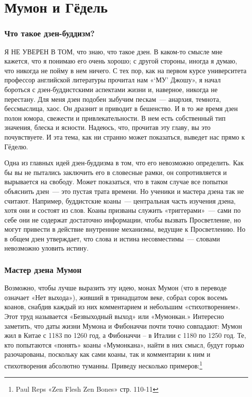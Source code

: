 \documentclass[../main.tex]{subfiles}
\begin{document}
\chapter{Мумон и Гёдель}

\subsection{Что такое дзен-буддизм?}

Я НЕ УВЕРЕН В ТОМ, что знаю, что такое дзен. В каком-то смысле мне кажется, что я понимаю его очень хорошо; с другой стороны, иногда я думаю, что никогда не пойму в нем ничего. С тех пор, как на первом курсе университета профессор английской литературы прочитал нам «\enquote*{МУ} Джошу», я начал бороться с дзен-буддистскими аспектами жизни и, наверное, никогда не перестану. Для меня дзен подобен зыбучим пескам~--- анархия, темнота, бессмыслица, хаос. Он дразнит и приводит в бешенство. И в то же время дзен полон юмора, свежести и привлекательности. В нем есть собственный тип значения, блеска и ясности. Надеюсь, что, прочитав эту главу, вы это почувствуете. И эта тема, как ни странно может показаться, выведет нас прямо к Гёделю.

Одна из главных идей дзен-буддизма в том, что его невозможно определить. Как бы вы не пытались заключить его в словесные рамки, он сопротивляется и вырывается на свободу. Может показаться, что в таком случае все попытки объяснить дзен~--- это пустая трата времени. Но ученики и мастера дзена так не считают. Например, буддистские коаны~--- центральная часть изучения дзена, хотя они и состоят из слов. Коаны призваны служить «триггерами»~--- сами по себе они не содержат достаточно информации, чтобы вызвать Просветление, но могут привести в действие внутренние механизмы, ведущие к Просветлению. Но в общем дзен утверждает, что слова и истина несовместимы~--- словами невозможно уловить истину.


\subsection{Мастер дзена Мумон}

Возможно, чтобы лучше выразить эту идею, монах Мумон (что в переводе означает «Нет выхода»), живший в тринадцатом веке, собрал сорок восемь коанов, снабдив каждый из них комментарием и небольшим «стихотворением». Этот труд называется «Безвыходный выход» или «Мумонкан.» Интересно заметить, что даты жизни Мумона и Фибоначчи почти точно совпадают: Мумон жил в Китае с 1183 по 1260 год, а Фибоначчи \--- в Италии с 1180 по 1250 год. Те, кто попытаются «понять» коаны «Мумонкана», найти в них смысл, будут горько разочарованы, поскольку как сами коаны, так и комментарии к ним и стихотворения абсолютно туманны. Приведу несколько примеров:\footnote{Paul Reps «Zen Flesh Zen Bones» стр. 110-11}
\end{document}
